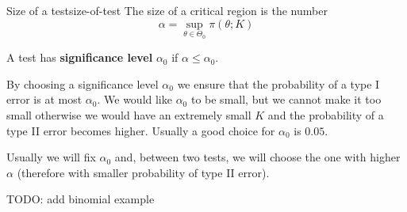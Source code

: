 \documentclass[12pt]{extarticle}
\begin{document}
\begin{definition}{Size of a test}{size-of-test}
    The size of a critical region is the number
    \begin{equation}
        \alpha = \sup_{\theta \in \Theta_0} \pi(\theta; K)
    \end{equation}

    A test has \textbf{significance level} $\alpha_0$ if $\alpha \leq \alpha_0$.
\end{definition}

By choosing a significance level $\alpha_0$ we ensure that the probability of a type I error is at most $\alpha_0$.
We would like $\alpha_0$ to be small, but we cannot make it too small otherwise we would have an extremely small $K$ and the probability of a type II error becomes higher.
Usually a good choice for $\alpha_0$ is $0.05$.

Usually we will fix $\alpha_0$ and, between two tests, we will choose the one with higher $\alpha$ (therefore with smaller probability of type II error).

TODO: add binomial example
\end{document}
